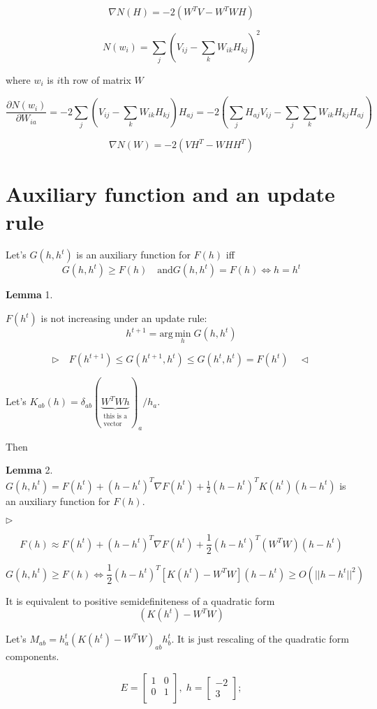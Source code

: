 \documentclass{extreport}
\begin{document}
\[
  \nabla N(H) = -2 ( W^TV - W^TWH )
\]

\[
  N(w_i) = \sum_j \left( V_{ij} - \sum_k W_{ik}H_{kj} \right)^2
\]

where $w_i$ is $i$th row of matrix $W$

\[
  \frac{\partial N(w_i)}{\partial W_{ia}} =
  -2 \sum_j
    \left(
      V_{ij} - \sum_k W_{ik}H_{kj}
    \right)
  H_{aj} =
  -2
    \left(
      \sum_j H_{aj}V_{ij} - \sum_j \sum_k W_{ik}H_{kj}H_{aj}
    \right)
\]

\[
  \nabla N(W) = -2 ( VH^T - WHH^T )
\]

\section{Auxiliary function and an update rule}

Let's $G(h, h^t)$ is an auxiliary function for $F(h)$ iff
\[
  G(h,h^t) \geqslant F(h) \quad \text{and}
  G(h,h^t) = F(h) \iff h = h^t
\]

\textbf{Lemma} 1.

$F(h^t)$ is not increasing under an update rule:
\[
  h^{t+1} = \text{arg} \, \underset{h}{\text{min}} \; G(h,h^t)
\]

\[
  \rhd \quad
    F(h^{t+1}) \leqslant G(h^{t+1},h^t) \leqslant G(h^t,h^t) = F(h^t) \quad
  \lhd
\]

Let's $K_{ab}(h) =
  \delta_{ab}
  (\underbrace{W^T W h}_{\substack{\text{this is a}\\ \text{vector}}})_a
  / h_a$.

Then

\textbf{Lemma} 2.
$G(h,h^t) = F(h^t) + (h - h^t)^T \nabla F(h^t)
  + \frac{1}{2} (h - h^t)^T K(h^t) (h - h^t)$
is an auxiliary function for $F(h)$.

$\rhd$

$$F(h) \approx F(h^t) + (h - h^t)^T \nabla F(h^t)
  + \frac{1}{2} (h - h^t)^T (W^TW) (h - h^t)$$

$$G(h,h^t) \geqslant F(h) \iff
\frac{1}{2} (h - h^t)^T \left[K(h^t) - W^TW\right] (h - h^t)
\geqslant O(||h - h^t||^2)$$

It is equivalent to positive semidefiniteness of a quadratic form
$$(K(h^t) - W^TW)$$

Let's $M_{ab} = h_a^t (K(h^t) - W^T W)_{ab} h_b^t$.
It is just rescaling of the quadratic form components.

\[
  E =
  \begin{bmatrix}
    1 & 0 \\
    0 & 1 \\
  \end{bmatrix}, \;
  h = \begin{bmatrix} -2 \\ 3 \end{bmatrix};
\]
\end{document}
